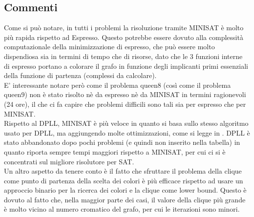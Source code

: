 \documentclass[a4paper,11pt]{article} %
\begin{document}


\subsection{Commenti}
Come si può notare, in tutti i problemi la risoluzione tramite MINISAT è molto più rapida rispetto ad Espresso. Questo potrebbe essere dovuto alla complessità computazionale della minimizzazione di espresso, che può essere molto dispendiosa sia in termini di tempo che di risorse, dato che le 3 funzioni interne di espresso portano a colorare il grafo in funzione degli implicanti primi essenziali della funzione di partenza (complessi da calcolare).\\
E' interessante notare però come il problema queen8 (così come il problema queen9) non è stato risolto nè da espresso nè da MINISAT in termini ragionevoli (24 ore), il che ci fa capire che problemi difficili sono tali sia per espresso che per MINISAT.\\
Rispetto al DPLL, MINISAT è più veloce in quanto si basa sullo stesso algoritmo usato per DPLL, ma aggiungendo molte ottimizzazioni, come si legge in \cite{minisat}. DPLL è stato abbandonato dopo pochi problemi (e quindi non inserito nella tabella) in quanto riporta sempre tempi maggiori rispetto a MINISAT, per cui ci si è concentrati sul migliore risolutore per SAT.\\
Un altro aspetto da tenere conto è il fatto che sfruttare il problema della clique come punto di partenza della scelta dei colori è più efficace rispetto ad usare un approccio binario per la ricerca dei colori e la clique come lower bound. Questo è dovuto al fatto che, nella maggior parte dei casi, il valore della clique più grande è molto vicino al numero cromatico del grafo, per cui le iterazioni sono minori.

\pagebreak
\end{document}
